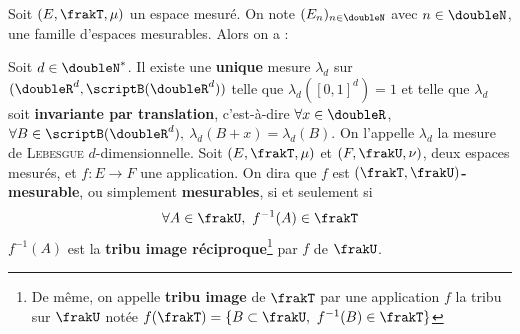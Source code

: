 Soit $(E,\frakT,\mu)$ un espace mesuré. On note $(E_n)_{n\in\doubleN}$ avec $n\in\doubleN$, une famille d'espaces mesurables. Alors on a :
Soit $d\in\doubleN^*$. Il existe une \textbf{unique} mesure $\lambda_d$ sur $(\doubleR^d,\scriptB(\doubleR^d))$ telle que $\lambda_d([0,1]^d)=1$ et telle que $\lambda_d$ soit \textbf{invariante par translation}, c'est-à-dire $\forall x\in\doubleR$, $\forall B\in\scriptB(\doubleR^d),$ $\lambda_d(B+x) = \lambda_d(B)$. On l'appelle $\lambda_d$ la mesure de \textsc{Lebesgue} $d$-dimensionnelle.
Soit $(E,\frakT,\mu)$ et $(F,\frakU,\nu)$, deux espaces mesurés, et $f\colon E\to F$ une application. On dira que $f$ est $(\frakT,\frakU)$\textbf{-mesurable}, ou simplement \textbf{mesurables}, si et seulement si 
\begin{equation*}
\forall A\in\frakU,~f^{-1}(A)\in\frakT
\end{equation*}
$f^{-1}(A)$ est la \textbf{tribu image réciproque}\footnote{De même, on appelle \textbf{tribu image} de $\frakT$ par une application $f$ la tribu sur $\frakU$ notée $f(\frakT) = \lbrace B\subset \frakU,~f^{-1}(B)\in\frakT\rbrace$} par $f$ de $\frakU$.